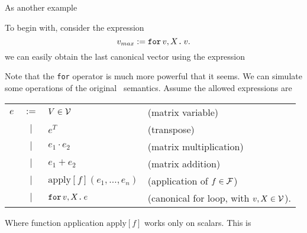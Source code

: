 As another example	



To begin with, consider the expression $$v_{max} := \texttt{for}\, v,X \texttt{.}\, v.$$
we can easily obtain the last canonical vector using the expression
\medskip

Note that the  \texttt{for} operator is much more powerful that it seems. We can simulate some operations of the original \lang\ semantics. Assume the allowed expressions are

\begin{tabular}{lcll}
$e$ & $:=$ & $V\in \mathcal{V}$ & (matrix variable)\\
 & $|$ & $e^T$ & (transpose)\\ 
 & $|$ & $e_1 \cdot e_2$ & (matrix multiplication)\\   
 & $|$ & $e_1 + e_2$ & (matrix addition)\\    
 & $|$ & $\text{apply}[f](e_1,\ldots ,e_n)$ & (application of $f\in \mathcal{F}$)\\
 & $|$ & $\texttt{for}\, v,X \texttt{.}\, e$ & (canonical for loop, with $v, X \in \mathcal{V}$). 
\end{tabular}

Where function application $\text{apply}[f]$ works only on scalars. This is 

